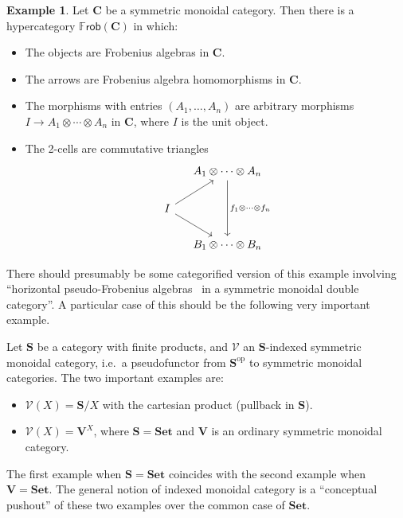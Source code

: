 \documentclass{article}
\theoremstyle{definition}
\newtheorem{eg}[thm]{Example}
\theoremstyle{remark}
\def\V{\mathscr{V}}
\def\frob{\mathbb{F}\mathsf{rob}}
\def\Set{\mathbf{Set}}
\def\op{^{\mathrm{op}}}
\def\bC{\ensuremath{\mathbf{C}}\xspace}
\def\bS{\ensuremath{\mathbf{S}}\xspace}
\begin{document}
\begin{eg}
  Let \bC be a symmetric monoidal category.
  Then there is a hypercategory $\frob(\bC)$ in which:
  \begin{itemize}
  \item The objects are Frobenius algebras in \bC.
  \item The arrows are Frobenius algebra homomorphisms in \bC.
  \item The morphisms with entries $(A_1,\dots,A_n)$ are arbitrary morphisms $I \to A_1\otimes\cdots\otimes A_n$ in \bC, where $I$ is the unit object.
  \item The 2-cells are commutative triangles
    \[
    \begin{tikzcd}[column sep=small]
      & A_1\otimes\cdots\otimes A_n \ar[dd,"f_1\otimes\cdots\otimes f_n"] \\
      I \ar[ur] \ar[dr] \\
      & B_1\otimes\cdots\otimes B_n
    \end{tikzcd}
    \]
  \end{itemize}
\end{eg}

There should presumably be some categorified version of this example involving ``horizontal pseudo-Frobenius algebras~\cite{lauda:psfrob} in a symmetric monoidal double category''.
A particular case of this should be the following very important example.

Let \bS be a category with finite products, and $\V$ an \bS-indexed symmetric monoidal category, i.e.\ a pseudofunctor from $\bS\op$ to symmetric monoidal categories.
The two important examples are:
\begin{itemize}
\item $\V(X) = \bS/X$ with the cartesian product (pullback in \bS).
\item $\V(X) = \mathbf{V}^X$, where $\bS=\Set$ and $\mathbf{V}$ is an ordinary symmetric monoidal category.
\end{itemize}
The first example when $\bS=\Set$ coincides with the second example when $\mathbf{V}=\Set$.
The general notion of indexed monoidal category is a ``conceptual pushout'' of these two examples over the common case of $\Set$.
\end{document}
